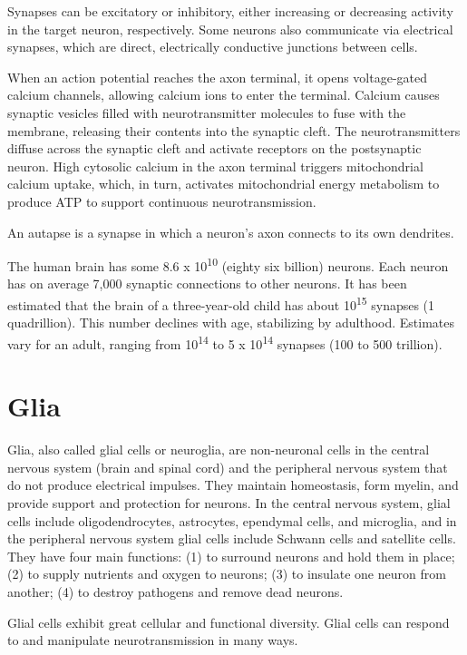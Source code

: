 Synapses can be excitatory or inhibitory, either increasing or decreasing activity in the target neuron, respectively. Some neurons also communicate via electrical synapses, which are direct, electrically conductive junctions between cells.

When an action potential reaches the axon terminal, it opens voltage-gated calcium channels, allowing calcium ions to enter the terminal. Calcium causes synaptic vesicles filled with neurotransmitter molecules to fuse with the membrane, releasing their contents into the synaptic cleft. The neurotransmitters diffuse across the synaptic cleft and activate receptors on the postsynaptic neuron. High cytosolic calcium in the axon terminal triggers mitochondrial calcium uptake, which, in turn, activates mitochondrial energy metabolism to produce ATP to support continuous neurotransmission.

An autapse is a synapse in which a neuron's axon connects to its own dendrites.

The human brain has some 8.6 x 10\textsuperscript{10} (eighty six billion) neurons. Each neuron has on average 7,000 synaptic connections to other neurons. It has been estimated that the brain of a three-year-old child has about 10\textsuperscript{15} synapses (1 quadrillion). This number declines with age, stabilizing by adulthood. Estimates vary for an adult, ranging from 10\textsuperscript{14} to 5 x 10\textsuperscript{14} synapses (100 to 500 trillion).

\hypertarget{glia}{%
\section{Glia}\label{glia}}

Glia, also called glial cells or neuroglia, are non-neuronal cells in the central nervous system (brain and spinal cord) and the peripheral nervous system that do not produce electrical impulses. They maintain homeostasis, form myelin, and provide support and protection for neurons. In the central nervous system, glial cells include oligodendrocytes, astrocytes, ependymal cells, and microglia, and in the peripheral nervous system glial cells include Schwann cells and satellite cells. They have four main functions: (1) to surround neurons and hold them in place; (2) to supply nutrients and oxygen to neurons; (3) to insulate one neuron from another; (4) to destroy pathogens and remove dead neurons.

Glial cells exhibit great cellular and functional diversity. Glial cells can respond to and manipulate neurotransmission in many ways.

